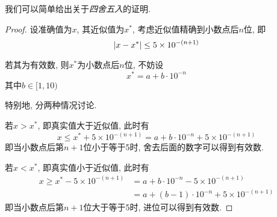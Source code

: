\begin{extend}
    我们可以简单给出关于\emph{四舍五入}的证明.

    \begin{proof}
        设准确值为$x$, 其近似值为$x^*$, 考虑近似值精确到小数点后$n$位, 即
        \begin{equation*}
            \abs{x-x^*}\le5\times10^{-(n+1)}
        \end{equation*}

        若其为有效数, 则$x^*$为小数点后$n$位, 不妨设
        \begin{equation*}
            x^*=a+b\cdot10^{-n}
        \end{equation*}
        其中$b\in[1,10)$

        特别地, 分两种情况讨论. 

        若$x>x^*$, 即真实值大于近似值, 此时有
        \begin{equation*}
            x\le x^*+5\times10^{-(n+1)}=a+b\cdot10^{-n}+5\times10^{-(n+1)}
        \end{equation*}
        即当小数点后第$n+1$位小于等于5时, 舍去后面的数字可以得到有效数.

        若$x<x^*$, 即真实值小于近似值, 此时有
        \begin{align*}
            x\ge x^*-5\times10^{-(n+1)}&=a+b\cdot10^{-n}-5\times10^{-(n+1)}\\
            &=a+(b-1)\cdot10^{-n}+5\times10^{-(n+1)}
        \end{align*}
        即当小数点后第$n+1$位大于等于5时, 进位可以得到有效数.
    \end{proof}
\end{extend}

